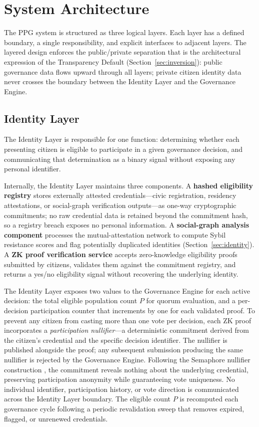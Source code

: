 \documentclass[12pt,a4paper,oneside]{report}
\begin{document}
\chapter{System Architecture}
\label{sec:architecture}

The PPG system is structured as three logical layers. Each layer has a defined boundary, a single responsibility, and explicit interfaces to adjacent layers. The layered design enforces the public/private separation that is the architectural expression of the Transparency Default (Section~\ref{sec:inversion}): public governance data flows upward through all layers; private citizen identity data never crosses the boundary between the Identity Layer and the Governance Engine.

\section{Identity Layer}

The Identity Layer is responsible for one function: determining whether each presenting citizen is eligible to participate in a given governance decision, and communicating that determination as a binary signal without exposing any personal identifier.

Internally, the Identity Layer maintains three components. A \textbf{hashed eligibility registry} stores externally attested credentials---civic registration, residency attestations, or social-graph verification outputs---as one-way cryptographic commitments; no raw credential data is retained beyond the commitment hash, so a registry breach exposes no personal information. A \textbf{social-graph analysis component} processes the mutual-attestation network to compute Sybil resistance scores and flag potentially duplicated identities (Section~\ref{sec:identity}). A \textbf{ZK proof verification service} accepts zero-knowledge eligibility proofs submitted by citizens, validates them against the commitment registry, and returns a yes/no eligibility signal without recovering the underlying identity.

The Identity Layer exposes two values to the Governance Engine for each active decision: the total eligible population count $P$ for quorum evaluation, and a per-decision participation counter that increments by one for each validated proof. To prevent any citizen from casting more than one vote per decision, each ZK proof incorporates a \emph{participation nullifier}---a deterministic commitment derived from the citizen's credential and the specific decision identifier. The nullifier is published alongside the proof; any subsequent submission producing the same nullifier is rejected by the Governance Engine. Following the Semaphore nullifier construction \citep{boneh2020graduate}, the commitment reveals nothing about the underlying credential, preserving participation anonymity while guaranteeing vote uniqueness. No individual identifier, participation history, or vote direction is communicated across the Identity Layer boundary. The eligible count $P$ is recomputed each governance cycle following a periodic revalidation sweep that removes expired, flagged, or unrenewed credentials.
\end{document}
